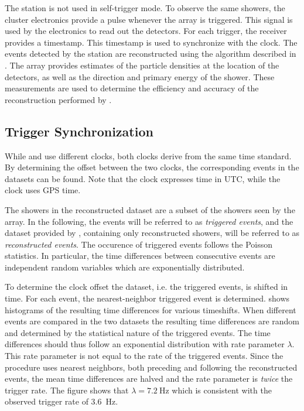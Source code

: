 The \hisparc station is not used in self-trigger mode. To observe the same
showers, the cluster electronics provide a pulse whenever the \kascade array is
triggered.  This signal is used by the \hisparc electronics to read out the
detectors.  For each trigger, the \hisparc {} receiver provides a
timestamp.
This timestamp is used to synchronize with the \kascade clock. The events
detected by the \hisparc station are reconstructed using the algorithm described
in . The \kascade array provides estimates of the
particle densities at the location of the \hisparc detectors, as well as the
direction and primary energy of the shower. These measurements are used to
determine the efficiency and accuracy of the reconstruction performed by
\hisparc.


\subsection{Trigger Synchronization}

While \hisparc and \kascade use
different clocks, both clocks derive from the same time standard.  By
determining the offset between the two clocks, the corresponding events in the
datasets can be found.  Note that the \kascade clock expresses time
in UTC, while the \hisparc clock uses GPS time.

The showers in the reconstructed dataset are a subset of the showers seen by the
\kascade array.  In the following, the \hisparc events will be referred to as
\emph{triggered events}, and the dataset provided by \kascade, containing only
reconstructed showers, will be referred to as \emph{reconstructed events}. The
occurence of triggered events follows the Poisson statistics.
In particular, the time differences between consecutive events are independent
random variables which are exponentially distributed.

To determine the clock offset the \hisparc dataset, i.e. the triggered events,
is shifted in time.  For each event, the nearest-neighbor triggered event is
determined.   shows histograms of the resulting time
differences for various timeshifts. When different events are compared in the
two datasets the resulting time differences are random and determined by the
statistical nature of the triggered events.  The time differences should thus
follow an exponential distribution with rate parameter $\lambda$.  This rate
parameter is not equal to the rate of the triggered events.  Since the procedure
uses nearest neighbors, both preceding and following the reconstructed events,
the mean time differences are halved and the rate parameter is \emph{twice} the
trigger rate.  The figure shows that $\lambda = \SI{7.2}{\hertz}$
which is consistent with the observed trigger rate of \SI{3.6}{\hertz}.

